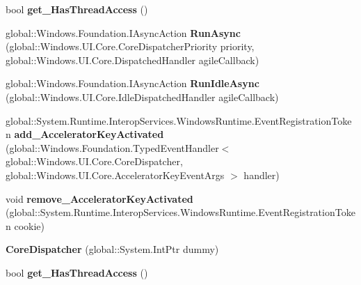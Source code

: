\begin{DoxyCompactItemize}
bool {\bfseries get\+\_\+\+Has\+Thread\+Access} ()
\item 
\mbox{\label{class_windows_1_1_u_i_1_1_core_1_1_core_dispatcher_ab32476eaa8140ce65276d22b3ca91205}} 
global\+::\+Windows.\+Foundation.\+I\+Async\+Action {\bfseries Run\+Async} (global\+::\+Windows.\+U\+I.\+Core.\+Core\+Dispatcher\+Priority priority, global\+::\+Windows.\+U\+I.\+Core.\+Dispatched\+Handler agile\+Callback)
\item 
\mbox{\label{class_windows_1_1_u_i_1_1_core_1_1_core_dispatcher_ae1d81c29e61aa9d3e601781f291624c6}} 
global\+::\+Windows.\+Foundation.\+I\+Async\+Action {\bfseries Run\+Idle\+Async} (global\+::\+Windows.\+U\+I.\+Core.\+Idle\+Dispatched\+Handler agile\+Callback)
\item 
\mbox{\label{class_windows_1_1_u_i_1_1_core_1_1_core_dispatcher_ae59e989cb2be9847e256c8717dcf0763}} 
global\+::\+System.\+Runtime.\+Interop\+Services.\+Windows\+Runtime.\+Event\+Registration\+Token {\bfseries add\+\_\+\+Accelerator\+Key\+Activated} (global\+::\+Windows.\+Foundation.\+Typed\+Event\+Handler$<$ global\+::\+Windows.\+U\+I.\+Core.\+Core\+Dispatcher, global\+::\+Windows.\+U\+I.\+Core.\+Accelerator\+Key\+Event\+Args $>$ handler)
\item 
\mbox{\label{class_windows_1_1_u_i_1_1_core_1_1_core_dispatcher_a96732786d7ff5dad968e1ed05e297c99}} 
void {\bfseries remove\+\_\+\+Accelerator\+Key\+Activated} (global\+::\+System.\+Runtime.\+Interop\+Services.\+Windows\+Runtime.\+Event\+Registration\+Token cookie)
\item 
\mbox{\label{class_windows_1_1_u_i_1_1_core_1_1_core_dispatcher_a88a12a752cb9f80bb154d5d4f57d0d75}} 
{\bfseries Core\+Dispatcher} (global\+::\+System.\+Int\+Ptr dummy)
\item 
\mbox{\label{class_windows_1_1_u_i_1_1_core_1_1_core_dispatcher_aae3a5de5404c93a4fced870962f00905}} 
bool {\bfseries get\+\_\+\+Has\+Thread\+Access} ()
\item 
\mbox{\label{class_windows_1_1_u_i_1_1_core_1_1_core_dispatcher_ab32476eaa8140ce65276d22b3ca91205}} 

\end{DoxyCompactItemize}
